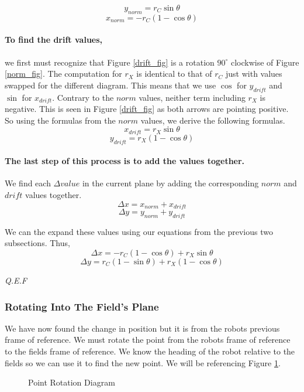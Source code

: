 \documentclass[12pt]{article}
\begin{document}
\centering
$$y_{norm} = r_C \sin\theta$$
$$x_{norm} = -r_C(1-\cos\theta)$$

\raggedright

\paragraph{To find the drift values,} we first must recognize that Figure \ref{drift_fig} is a rotation $90^{\circ}$ clockwise of Figure \ref{norm_fig}. The computation for $r_X$ is identical to that of $r_C$ just with values swapped for the different diagram. This means that we use $\cos$ for $y_{drift}$ and $\sin$ for $x_{drift}$. Contrary to the $norm$ values, neither term including $r_X$ is negative. This is seen in Figure \ref{drift_fig} as both arrows are pointing positive. So using the formulas from the $norm$ values, we derive the following formulas.
$$ x_{drift} = r_X \sin\theta$$
$$ y_{drift} = r_X (1-\cos\theta)$$

\paragraph{The last step of this process is to add the values together.} We find each $\Delta value$ in the current plane by adding the corresponding $norm$ and $drift$ values together.
$$ \Delta x = x_{norm} + x_{drift} $$
$$ \Delta y = y_{norm} + y_{drift} $$

We can the expand these values using our equations from the previous two subsections. Thus,
$$ \Delta x =  -r_C (1-\cos\theta) + r_X \sin\theta $$
$$ \Delta y =  r_C (1-\sin\theta) + r_X (1-\cos\theta) $$

\textit{Q.E.F}
\subsubsection{Rotating Into The Field's Plane}
We have now found the change in position but it is from the robots previous frame of reference.
We must rotate the point from the robots frame of reference to the fields frame of reference. We know the heading of the robot relative to the fields so we can use it to find the new point.
We will be referencing Figure \ref{FIG::PointRot}.
\begin{figure}
\caption{Point Rotation Diagram}
\label{FIG::PointRot}
\centering
{}
\end{figure}
\end{document}
